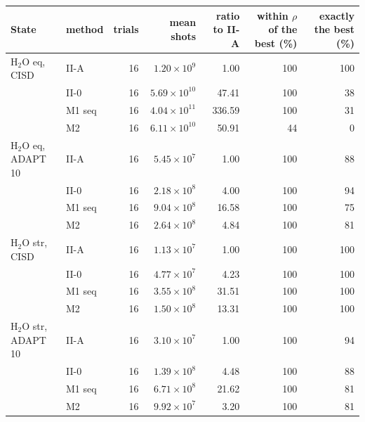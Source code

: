 \begin{tabular}{@{}llrrrrr@{}}
\toprule
State & method & trials & mean shots & ratio to II-A & within $\rho$ of the best (\%) & exactly the best (\%) \\
\midrule
H$_2$O eq, CISD & II-A & 16 & $1.20\times10^{9}$ & 1.00 & 100 & 100 \\
 & II-0 & 16 & $5.69\times10^{10}$ & 47.41 & 100 & 38 \\
 & M1 seq & 16 & $4.04\times10^{11}$ & 336.59 & 100 & 31 \\
 & M2 & 16 & $6.11\times10^{10}$ & 50.91 & 44 & 0 \\
\midrule
H$_2$O eq, ADAPT 10 & II-A & 16 & $5.45\times10^{7}$ & 1.00 & 100 & 88 \\
 & II-0 & 16 & $2.18\times10^{8}$ & 4.00 & 100 & 94 \\
 & M1 seq & 16 & $9.04\times10^{8}$ & 16.58 & 100 & 75 \\
 & M2 & 16 & $2.64\times10^{8}$ & 4.84 & 100 & 81 \\
\midrule
H$_2$O str, CISD & II-A & 16 & $1.13\times10^{7}$ & 1.00 & 100 & 100 \\
 & II-0 & 16 & $4.77\times10^{7}$ & 4.23 & 100 & 100 \\
 & M1 seq & 16 & $3.55\times10^{8}$ & 31.51 & 100 & 100 \\
 & M2 & 16 & $1.50\times10^{8}$ & 13.31 & 100 & 100 \\
\midrule
H$_2$O str, ADAPT 10 & II-A & 16 & $3.10\times10^{7}$ & 1.00 & 100 & 94 \\
 & II-0 & 16 & $1.39\times10^{8}$ & 4.48 & 100 & 88 \\
 & M1 seq & 16 & $6.71\times10^{8}$ & 21.62 & 100 & 81 \\
 & M2 & 16 & $9.92\times10^{7}$ & 3.20 & 100 & 81 \\
\bottomrule
\end{tabular}
